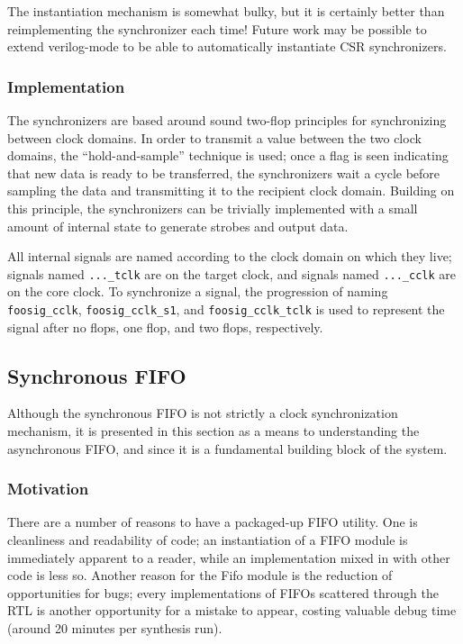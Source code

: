 \documentclass[10pt]{report}
\begin{document}
The instantiation mechanism is somewhat bulky, but it is certainly better
than reimplementing the synchronizer each time! Future work may be possible
to extend verilog-mode to be able to automatically instantiate CSR
synchronizers.

\subsubsection{Implementation}

The synchronizers are based around sound two-flop principles for
synchronizing between clock domains. In order to transmit a value between
the two clock domains, the ``hold-and-sample'' technique is used; once a
flag is seen indicating that new data is ready to be transferred, the
synchronizers wait a cycle before sampling the data and transmitting it to
the recipient clock domain. Building on this principle, the synchronizers
can be trivially implemented with a small amount of internal state to
generate strobes and output data.

All internal signals are named according to the clock domain on which they
live; signals named \texttt{...\_tclk} are on the target clock, and signals
named \texttt{...\_cclk} are on the core clock.  To synchronize a signal,
the progression of naming \texttt{foosig\_cclk}, \texttt{foosig\_cclk\_s1},
and \texttt{foosig\_cclk\_tclk} is used to represent the signal after no
flops, one flop, and two flops, respectively.

\subsection{Synchronous FIFO}

\label{sec:syncfifo}

Although the synchronous FIFO is not strictly a clock synchronization
mechanism, it is presented in this section as a means to understanding the
asynchronous FIFO, and since it is a fundamental building block of the
system.

\subsubsection{Motivation}

There are a number of reasons to have a packaged-up FIFO utility. One is
cleanliness and readability of code; an instantiation of a FIFO module is
immediately apparent to a reader, while an implementation mixed in with
other code is less so. Another reason for the Fifo module is the reduction
of opportunities for bugs; every implementations of FIFOs scattered through
the RTL is another opportunity for a mistake to appear, costing valuable
debug time (around 20 minutes per synthesis run).
\end{document}
